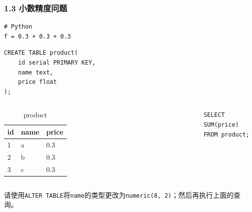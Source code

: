 \documentclass[aspectratio=169, 14pt]{beamer}
\begin{document}
\begin{frame}[fragile]
    \frametitle{1.3 小数精度问题}


    \begin{verbatim}
# Python
f = 0.3 + 0.3 + 0.3
    \end{verbatim}

\begin{verbatim}
CREATE TABLE product(
    id serial PRIMARY KEY,
    name text,
    price float
);
\end{verbatim}

\end{frame}

\begin{frame}[fragile]

    \begin{columns}
        \begin{table}
            \caption*{product}
            \begin{tabular}{lll}
              \toprule
              id & name & price \\
              \midrule
              1 & a & 0.3 \\
              2 & b & 0.3 \\
              3 & c & 0.3 \\
              \bottomrule
            \end{tabular}
        \end{table}
        \begin{verbatim}
SELECT SUM(price) 
FROM product;
        \end{verbatim}
    \end{columns}
    
 请使用\texttt{ALTER TABLE}将\texttt{name}的类型更改为\texttt{numeric(8, 2)}；然后再执行上面的查询。
\end{frame}
\end{document}
